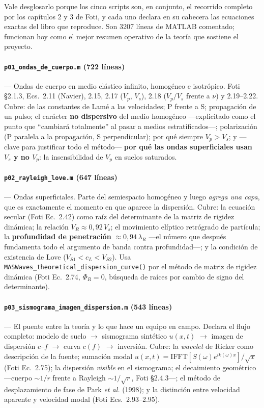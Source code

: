 Vale desglosarlo porque los cinco scripts son, en conjunto, el recorrido completo
por los cap\'itulos 2 y 3 de Foti, y cada uno declara en su cabecera las
ecuaciones exactas del libro que reproduce. Son \num{3207} l\'ineas de MATLAB
comentado; funcionan hoy como el mejor resumen operativo de la teor\'ia que
sostiene el proyecto.

\paragraph{\texttt{p01\_ondas\_de\_cuerpo.m} (722 l\'ineas)} --- Ondas de cuerpo
en medio el\'astico infinito, homog\'eneo e isotr\'opico. Foti \S2.1.3,
Ecs.~2.11 (Navier), 2.15, 2.17 ($V_p$, $V_s$), 2.18 ($V_p/V_s$ frente a $\nu$) y
2.19--2.22. Cubre: de las constantes de Lam\'e a las velocidades; P frente a S;
propagaci\'on de un pulso; el car\'acter \textbf{no dispersivo} del medio
homog\'eneo ---explicitado como el punto que ``cambiar\'a totalmente'' al pasar a
medios estratificados---; polarizaci\'on (P paralela a la propagaci\'on, S
perpendicular); por qu\'e siempre $V_p>V_s$; y ---clave para justificar todo el
m\'etodo--- \textbf{por qu\'e las ondas superficiales usan $V_s$ y no $V_p$}: la
insensibilidad de $V_p$ en suelos saturados.

\paragraph{\texttt{p02\_rayleigh\_love.m} (647 l\'ineas)} --- Ondas superficiales.
Parte del semiespacio homog\'eneo y luego \emph{agrega una capa}, que es
exactamente el momento en que aparece la dispersi\'on. Cubre: la ecuaci\'on
secular (Foti Ec.~2.42) como ra\'iz del determinante de la matriz de rigidez
din\'amica; la relaci\'on $V_R\approx 0{,}92\,V_s$; el movimiento el\'iptico
retr\'ogrado de part\'icula; la \textbf{profundidad de penetraci\'on}
$\approx 0{,}94\,\lambda_R$ ---el n\'umero que despu\'es fundamenta todo el
argumento de banda contra profundidad---; y la condici\'on de existencia de Love
($V_{S1}<c_L<V_{S2}$). Usa
\texttt{MASWaves\_theoretical\_dispersion\_curve()} por el m\'etodo de matriz de
rigidez din\'amica (Foti Ec.~2.74, $\Phi_R=0$, b\'usqueda de ra\'ices por cambio
de signo del determinante).

\paragraph{\texttt{p03\_sismograma\_imagen\_dispersion.m} (543 l\'ineas)} --- El
puente entre la teor\'ia y lo que hace un equipo en campo. Declara el flujo
completo: modelo de suelo $\to$ sismograma sint\'etico $u(x,t)$ $\to$ imagen de
dispersi\'on $c$--$f$ $\to$ curva $c(f)$ $\to$ inversi\'on. Cubre: la
\emph{wavelet} de Ricker como descripci\'on de la fuente; sumaci\'on modal
$u(x,t)=\mathrm{IFFT}[S(\omega)e^{ik(\omega)x}]/\sqrt{x}$ (Foti Ec.~2.75); la
dispersi\'on \emph{visible} en el sismograma; el decaimiento geom\'etrico
---cuerpo $\sim 1/r$ frente a Rayleigh $\sim 1/\sqrt{r}$, Foti \S2.4.3---; el
m\'etodo de desplazamiento de fase de Park \emph{et al.} (1998); y la distinci\'on
entre velocidad aparente y velocidad modal (Foti Ecs.~2.93--2.95).

